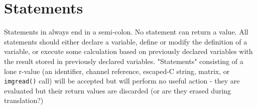 \section{Statements}
\label{sec:statements}

Statements in \sys{} always end in a semi-colon. No statement
can return a value. All statements should either declare a variable,
define or modify the definition of a variable, or execute
some calculation based on previously declared variables with
the result stored in previously declared variables.
"Statements" consisting of a lone r-value (an identifier,
channel reference, escaped-C string, matrix, or \texttt{imgread()} call)
will be accepted but will perform no useful action - they are evaluated but
their return values are discarded (or are they erased during translation?)
